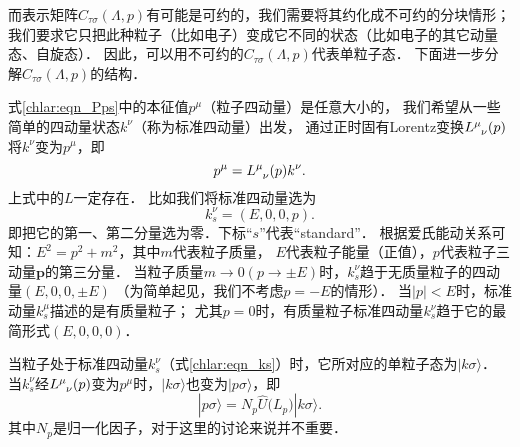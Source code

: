 而表示矩阵$C_{\tau\sigma}(\Lambda,p)$有可能是可约的，我们需要将其约化成不可约的分块情形；
我们要求它只把此种粒子（比如电子）变成它不同的状态（比如电子的其它动量态、自旋态）．
因此，可以用不可约的$C_{\tau\sigma}(\Lambda,p)$代表单粒子态．
下面进一步分解$C_{\tau\sigma}(\Lambda,p)$的结构．



式\eqref{chlar:eqn_Pps}中的本征值$p^\mu$（粒子四动量）是任意大小的，
我们希望从一些简单的四动量状态$k^\nu$（称为{\heiti 标准四动量}）出发，
通过正时固有Lorentz变换$L^\mu_{\hphantom{\mu}\nu}(p)$将$k^\nu$变为$p^\mu$，即
\begin{equation}\label{chlar:eqn_pLk}
	p^\mu = L^\mu_{\hphantom{\mu}\nu}(p) k^\nu .
\end{equation}
上式中的$L$一定存在．
比如我们将标准四动量选为
\begin{equation}\label{chlar:eqn_ks}
	k^\nu_{s}=(E,0,0,p).
\end{equation}
即把它的第一、第二分量选为零．下标“$s$”代表“standard”．
根据爱氏能动关系可知：$E^2=p^2+m^2$，其中$m$代表粒子质量，
$E$代表粒子能量（正值），$p$代表粒子三动量$\boldsymbol{p}$的第三分量．
当粒子质量$m\to 0(p\to \pm E)$时，$k^\nu_s$趋于无质量粒子的四动量$(E,0,0,\pm E)$
（为简单起见，我们不考虑$p=-E$的情形）．
当$|p| <E$时，标准动量$k^\mu_s$描述的是有质量粒子；
尤其$p=0$时，有质量粒子标准四动量$k^\nu_{s}$趋于它的最简形式$(E,0,0,0)$．

当粒子处于标准四动量$k^\nu_s$（式\eqref{chlar:eqn_ks}）时，它所对应的单粒子态为$|k\sigma\rangle$．
当$k^\nu_s$经$L^\mu_{\hphantom{\mu}\nu}(p)$变为$p^\mu$时，$|k\sigma\rangle$也变为$|p\sigma\rangle$，即
\begin{equation}\label{chlar:eqn_pULk}
	|p\sigma\rangle = N_p \hat{U}\bigl(L_p\bigr) |k\sigma\rangle.
\end{equation}
其中$N_p$是归一化因子，对于这里的讨论来说并不重要．

